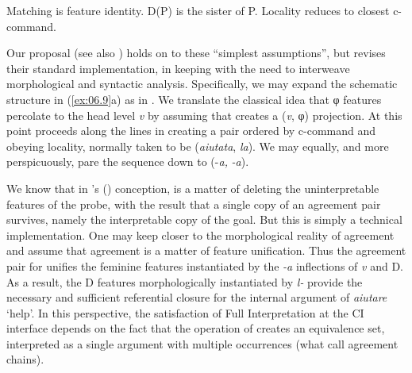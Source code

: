 \documentclass[output=paper]{langsci/langscibook}
\begin{document}
\ea%
    \label{ex:06.12} \textcite[122]{Chomsky2000}
    \ea Matching is feature identity.
	\ex D(P) is the sister of P.
    \ex Locality reduces to closest c-command.
    \z
\z

Our proposal (see also
\citealt{ManziniSavoia2005,ManziniSavoia2007,ManSav2011}) holds on to
these “simplest assumptions”, but revises their standard implementation, in
keeping with the need to interweave morphological and syntactic analysis.
Specifically, we may expand the schematic structure in (\ref{ex:06.9}a) as in
. We translate the classical idea that φ features percolate to
the head level \emph{v} by assuming that  creates a (\emph{v}, φ)
projection. At this point  proceeds along the lines in
 creating a pair ordered by c-command and obeying locality,
normally taken to be (\emph{aiutata}, \emph{la}). We may equally, and more
perspicuously, pare the  sequence down to (-\emph{a,} \emph{-a}).

\ea%
    \label{ex:06.13}
\z

We know that in \citeauthor{Chomsky2000}'s (\citeyear{Chomsky2000,Chomsky2001})
conception,  is a matter of deleting the uninterpretable features of
the probe, with the result that a single copy of an agreement pair survives,
namely the interpretable copy of the goal. But this is simply a technical
implementation. One may keep closer to the morphological reality of agreement
and assume that agreement is a matter of feature unification. Thus the
agreement pair for  unifies the feminine features instantiated
by the \emph{-a} inflections of \emph{v} and D. As a result, the D features
morphologically instantiated by \emph{l-} provide the necessary and sufficient
referential closure for the internal argument of \emph{aiutare} ‘help’. In this
perspective, the satisfaction of Full Interpretation at the \gls{CI} interface
depends on the fact that the operation of  creates an equivalence
set, interpreted as a single argument with multiple occurrences (what
\citealt{ManziniSavoia2007} call agreement chains).
\end{document}
